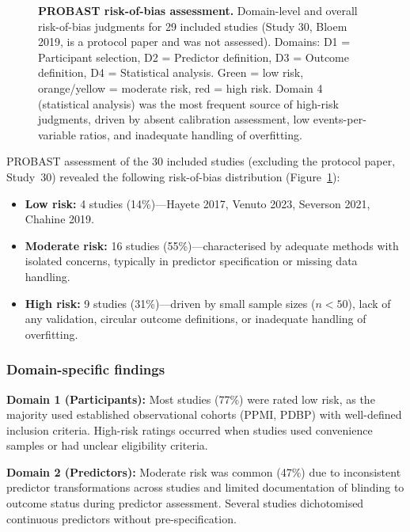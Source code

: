 \documentclass[11pt,a4paper]{article}
\begin{document}
\begin{figure}[H]
\caption{\textbf{PROBAST risk-of-bias assessment.} Domain-level and overall risk-of-bias judgments for 29 included studies (Study 30, Bloem 2019, is a protocol paper and was not assessed). Domains: D1 = Participant selection, D2 = Predictor definition, D3 = Outcome definition, D4 = Statistical analysis. Green = low risk, orange/yellow = moderate risk, red = high risk. Domain 4 (statistical analysis) was the most frequent source of high-risk judgments, driven by absent calibration assessment, low events-per-variable ratios, and inadequate handling of overfitting.}
\label{fig:probast}
\end{figure}

PROBAST assessment of the 30 included studies (excluding the protocol paper, Study~30) revealed the following risk-of-bias distribution (Figure~\ref{fig:probast}):
\begin{itemize}[leftmargin=*]
    \item \textbf{Low risk:} 4 studies (14\%)---Hayete 2017, Venuto 2023, Severson 2021, Chahine 2019.
    \item \textbf{Moderate risk:} 16 studies (55\%)---characterised by adequate methods with isolated concerns, typically in predictor specification or missing data handling.
    \item \textbf{High risk:} 9 studies (31\%)---driven by small sample sizes ($n < 50$), lack of any validation, circular outcome definitions, or inadequate handling of overfitting.
\end{itemize}

\subsubsection{Domain-specific findings}
\textbf{Domain 1 (Participants):} Most studies (77\%) were rated low risk, as the majority used established observational cohorts (PPMI, PDBP) with well-defined inclusion criteria. High-risk ratings occurred when studies used convenience samples or had unclear eligibility criteria.

\textbf{Domain 2 (Predictors):} Moderate risk was common (47\%) due to inconsistent predictor transformations across studies and limited documentation of blinding to outcome status during predictor assessment. Several studies dichotomised continuous predictors without pre-specification.
\end{document}
